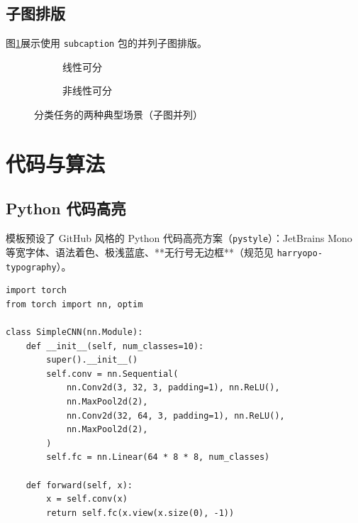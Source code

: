 \documentclass{harryopo-paper}
\begin{document}
\subsection{子图排版}

图\ref{fig:subfig}展示使用 \texttt{subcaption} 包的并列子图排版。

\begin{figure}[htbp]
\centering
\begin{subfigure}{0.45\textwidth}
\centering
{}
\caption{线性可分}
\end{subfigure}
\hfill
\begin{subfigure}{0.45\textwidth}
\centering
{}
\caption{非线性可分}
\end{subfigure}
\caption{分类任务的两种典型场景（子图并列）}
\label{fig:subfig}
\end{figure}

\section{代码与算法}
\label{sec:code}

\subsection{Python 代码高亮}

模板预设了 GitHub 风格的 Python 代码高亮方案（\texttt{pystyle}）：JetBrains Mono 等宽字体、语法着色、极浅蓝底、**无行号无边框**（规范见 \texttt{harryopo-typography}）。

\begin{lstlisting}[style=pystyle, caption={Python 示例：SGD 优化器实现}, label=lst:python]
import torch
from torch import nn, optim

class SimpleCNN(nn.Module):
    def __init__(self, num_classes=10):
        super().__init__()
        self.conv = nn.Sequential(
            nn.Conv2d(3, 32, 3, padding=1), nn.ReLU(),
            nn.MaxPool2d(2),
            nn.Conv2d(32, 64, 3, padding=1), nn.ReLU(),
            nn.MaxPool2d(2),
        )
        self.fc = nn.Linear(64 * 8 * 8, num_classes)

    def forward(self, x):
        x = self.conv(x)
        return self.fc(x.view(x.size(0), -1))
\end{lstlisting}
\end{document}
